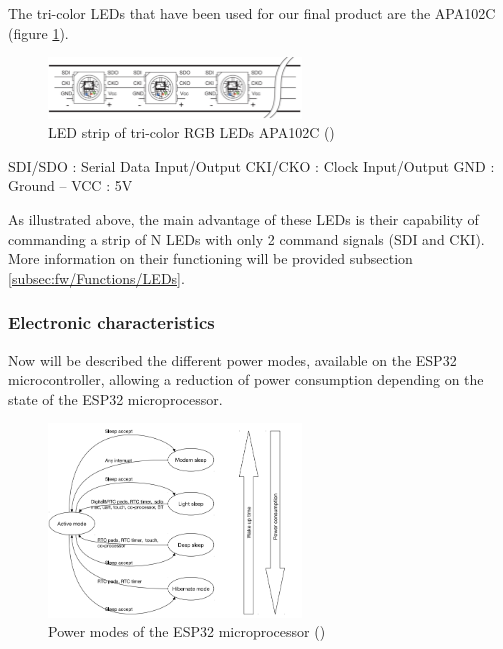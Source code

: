 The tri-color LEDs that have been used for our final product are the APA102C (figure \ref{fig:APA102C}).

\begin{figure}[H]
    \centering
    \includegraphics[width=0.6\textwidth]{images/EE_APA102C.PNG}
    \caption{LED strip of tri-color RGB LEDs APA102C (\cite{ledstripspec})}
    \label{fig:APA102C}
\end{figure}

\noindent SDI/SDO : Serial Data Input/Output \newline CKI/CKO : Clock Input/Output \newline GND : Ground -- VCC : 5V

\medskip As illustrated above, the main advantage of these LEDs is their capability of commanding a strip of N LEDs with only 2 command signals (SDI and CKI). More information on their functioning will be provided subsection \ref{subsec:fw/Functions/LEDs}.


\newpage
\subsubsection{Electronic characteristics}
\label{subsubsec:hardware/electronic_characteristics} 

Now will be described the different power modes, available on the ESP32 microcontroller, allowing a reduction of power consumption depending on the state of the ESP32 microprocessor.

\begin{figure}[H]
    \centering
    \includegraphics[width=0.6\textwidth]{images/EE_PowerModes.PNG}
    \caption{Power modes of the ESP32 microprocessor (\cite{esp32techrefmanual})}
    \label{fig:power_modes}
\end{figure}

